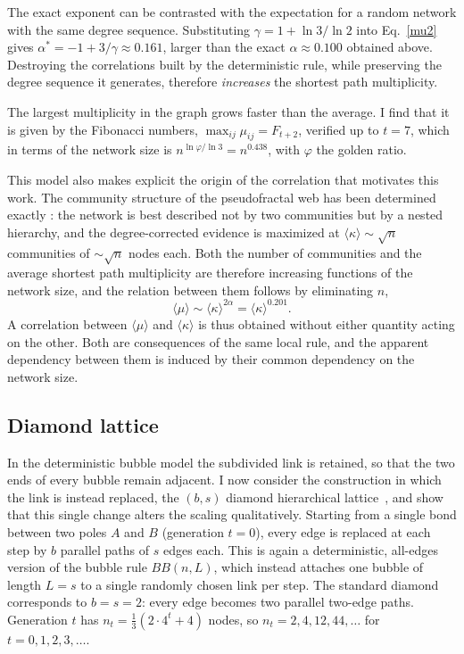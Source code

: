 \documentclass[reprint,aps,pre,amsmath,amssymb,superscriptaddress,showpacs]{revtex4-1}
\begin{document}
The exact exponent can be contrasted with the expectation for a random network with the same degree sequence. Substituting $\gamma = 1 + \ln 3/\ln 2$ into Eq.~\eqref{mu2} gives $\alpha^* = -1 + 3/\gamma \approx 0.161$, larger than the exact $\alpha \approx 0.100$ obtained above. Destroying the correlations built by the deterministic rule, while preserving the degree sequence it generates, therefore {\em increases} the shortest path multiplicity.

The largest multiplicity in the graph grows faster than the average. I find that it is given by the Fibonacci numbers, $\max_{ij}\mu_{ij} = F_{t+2}$, verified up to $t=7$, which in terms of the network size is $n^{\ln\varphi/\ln 3} = n^{0.438}$, with $\varphi$ the golden ratio.

This model also makes explicit the origin of the correlation that motivates this work. The community structure of the pseudofractal web has been determined exactly \cite{vazquez2026pseudofractal}: the network is best described not by two communities but by a nested hierarchy, and the degree-corrected evidence is maximized at $\langle\kappa\rangle\sim\sqrt{n}$ communities of $\sim\sqrt{n}$ nodes each. Both the number of communities and the average shortest path multiplicity are therefore increasing functions of the network size, and the relation between them follows by eliminating $n$,
%
\begin{equation}
\langle\mu\rangle \sim \langle\kappa\rangle^{2\alpha} = \langle\kappa\rangle^{0.201}.
\label{mukappaBBD}
\end{equation}
%
A correlation between $\langle\mu\rangle$ and $\langle\kappa\rangle$ is thus obtained without either quantity acting on the other. Both are consequences of the same local rule, and the apparent dependency between them is induced by their common dependency on the network size.

\subsection{Diamond lattice}
\label{diamond}

In the deterministic bubble model the subdivided link is retained, so that the two ends of every bubble remain adjacent. I now consider the construction in which the link is instead replaced, the $(b,s)$ diamond hierarchical lattice~\cite{migdal1975phase, kadanoff1976notes}, and show that this single change alters the scaling qualitatively. Starting from a single bond between two poles $A$ and $B$ (generation $t=0$), every edge is replaced at each step by $b$ parallel paths of $s$ edges each. This is again a deterministic, all-edges version of the bubble rule $BB(n, L)$, which instead attaches one bubble of length $L=s$ to a single randomly chosen link per step. The standard diamond corresponds to $b=s=2$: every edge becomes two parallel two-edge paths. Generation $t$ has $n_t = \frac13(2\cdot4^{t}+4)$ nodes, so $n_t=2,4,12,44,\ldots$ for $t=0,1,2,3,\ldots$.
\end{document}
